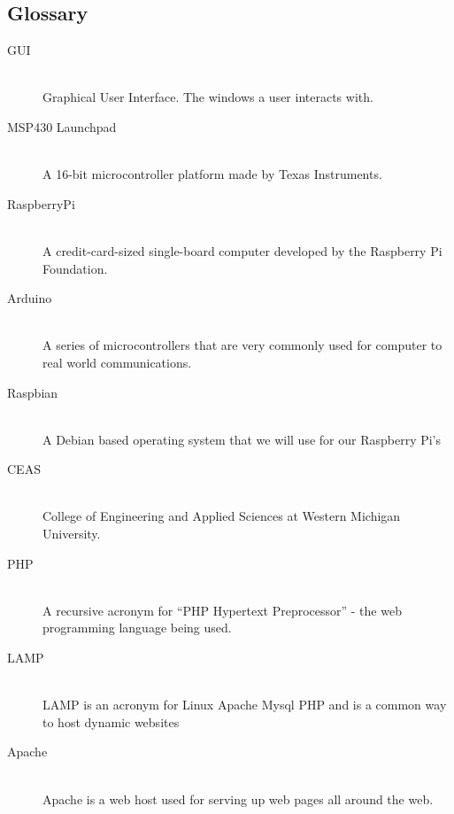 \documentclass{report}
\begin{document}
\subsection*{Glossary}
\begin{description}
	\item [GUI] \hfill \\
		Graphical User Interface. The windows a user interacts with.
	\item [MSP430 Launchpad] \hfill \\
		A 16-bit microcontroller platform made by Texas Instruments.
	\item [RaspberryPi] \hfill \\
		A credit-card-sized single-board computer developed by the Raspberry Pi Foundation.
	\item [Arduino] \hfill \\
		A series of microcontrollers that are very commonly used for computer to real world communications.
	\item [Raspbian] \hfill \\
		A Debian based operating system that we will use for our Raspberry Pi’s
	\item [CEAS] \hfill \\
		College of Engineering and Applied Sciences at Western Michigan University.
	\item [PHP] \hfill \\
		A recursive acronym for “PHP Hypertext Preprocessor” - the web programming language being used.
	\item [LAMP] \hfill \\
		LAMP is an acronym for Linux Apache Mysql PHP and is a common way to host dynamic websites
	\item [Apache] \hfill \\
		Apache is a web host used for serving up web pages all around the web.
\end{description}
\newpage
\end{document}
